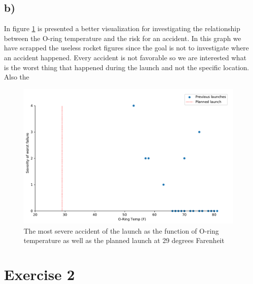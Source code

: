 \documentclass[a4paper,10pt]{article}
\begin{document}
\subsection*{b)}

In figure \ref{launch} is presented a better visualization for investigating the relationship between the O-ring temperature and the risk for an accident. In this graph we have scrapped the useless rocket figures since the goal is not to investigate where an accident happened. Every accident is not favorable so we are interested what is the worst thing that happened during the launch and not the specific location. Also the 

\begin{figure}
\centering
\includegraphics[width = \linewidth]{launch}
\caption{The most severe accident of the launch as the function of O-ring temperature as well as the planned launch at 29 degrees Farenheit}
\label{launch}
\end{figure}

\section*{Exercise 2}
\end{document}
